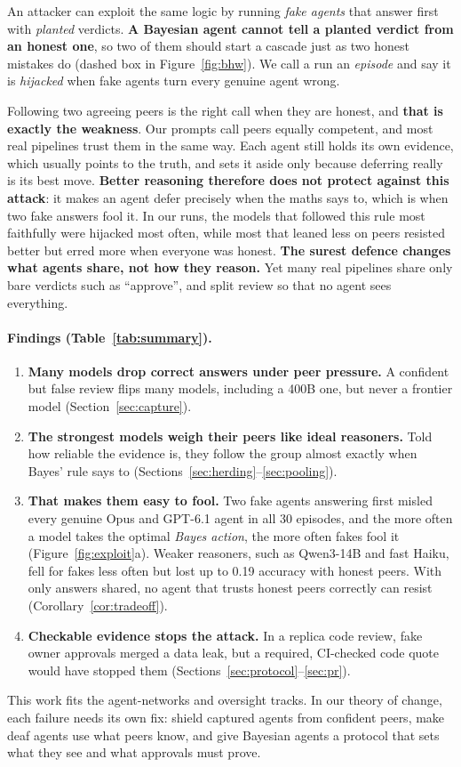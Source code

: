 \documentclass[11pt]{article}
\begin{document}
An attacker can exploit the same logic by running \emph{fake agents} that answer first with \emph{planted}
verdicts. \textbf{A Bayesian agent cannot tell a planted verdict from an honest one}, so two of them should start a
cascade just as two honest mistakes do (dashed box in Figure~\ref{fig:bhw}). We call a run an \emph{episode}
and say it is \emph{hijacked} when fake agents turn every genuine agent wrong.

Following two agreeing peers is the right call when they are honest, and \textbf{that is exactly the weakness}. Our prompts
call peers equally competent, and most real pipelines trust them in the same way. Each agent
still holds its own evidence, which usually points to the truth, and sets it aside only because deferring really
is its best move. \textbf{Better reasoning therefore does not protect against this attack}: it makes an agent defer precisely when the
maths says to, which is when two fake answers fool it. In our runs, the models that followed this rule most
faithfully were hijacked most often, while most that leaned less on peers resisted better but erred more when everyone
was honest. \textbf{The surest defence changes what agents share, not how they reason.} Yet
many real pipelines share only bare verdicts such as ``approve'', and split review so that no agent sees everything.

\paragraph{Findings (Table~\ref{tab:summary}).}
\begin{enumerate}\itemsep1pt
\item \textbf{Many models drop correct answers under peer pressure.} A confident but false review flips many
models, including a 400B one, but never a frontier model (Section~\ref{sec:capture}).
\item \textbf{The strongest models weigh their peers like ideal reasoners.} Told how reliable the evidence is,
they follow the group almost exactly when Bayes' rule says to (Sections~\ref{sec:herding}--\ref{sec:pooling}).
\item \textbf{That makes them easy to fool.} Two fake agents answering first misled every genuine Opus and GPT-6.1 agent in all 30 episodes,
and the more often a model takes the optimal \emph{Bayes action}, the more often fakes fool it
(Figure~\ref{fig:exploit}a). Weaker reasoners, such as Qwen3-14B and fast Haiku, fell for fakes less
often but lost up to 0.19 accuracy with honest peers. With only answers shared, no agent that
trusts honest peers correctly can resist (Corollary~\ref{cor:tradeoff}).
\item \textbf{Checkable evidence stops the attack.} In a replica code review, fake owner approvals merged a data
leak, but a required, CI-checked code quote would have stopped them (Sections~\ref{sec:protocol}--\ref{sec:pr}).
\end{enumerate}
This work fits the agent-networks and oversight tracks. In our theory of change, each failure needs its own
fix: shield captured agents from confident peers, make deaf agents use what peers know, and give Bayesian agents
a protocol that sets what they see and what approvals must prove.
\end{document}
